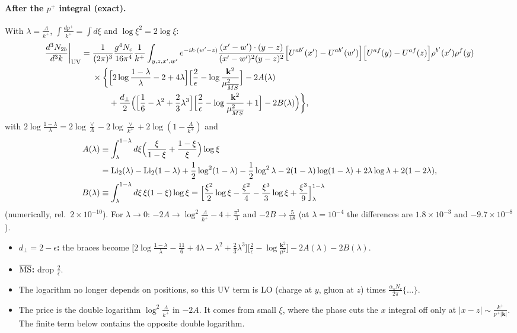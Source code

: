 \documentclass[10pt]{article}
\numberwithin{equation}{section}
\begin{document}
\paragraph{After the $p^+$ integral (exact).} With $\lambda=\frac{\Lambda}{k^+}$, $\int\frac{dp^+}{k^+}=\int d\xi$ and $\log\xi^2=2\log\xi$:
\begin{align}
\frac{d^{3}N_{2b}}{d^{3}k}\bigg|_{\rm UV}={}&\frac{1}{(2\pi)^{3}}\frac{g^{4}N_{c}}{16\pi^{4}}\frac{1}{k^{+}}\int_{y,z,x',w'}e^{-ik\cdot(w'-z)}\frac{(x'-w')\cdot(y-z)}{(x'-w')^{2}(y-z)^{2}}\Big[U^{ab'}(x')-U^{ab'}(w')\Big]\Big[U^{af}(y)-U^{af}(z)\Big]\rho^{b'}(x')\rho^{f}(y)\notag\\
&\times\bigg\{\Big[2\log\frac{1-\lambda}{\lambda}-2+4\lambda\Big]\Big[\frac2\epsilon-\log\frac{\mathbf k^2}{\mu^2_{\overline{MS}}}\Big]-2A(\lambda)\notag\\
&\qquad+\frac{d_\perp}{2}\Big(\Big[\frac16-\lambda^2+\frac23\lambda^3\Big]\Big[\frac2\epsilon-\log\frac{\mathbf k^2}{\mu^2_{\overline{MS}}}+1\Big]-2B(\lambda)\Big)\bigg\},
\label{eq:UV}
\end{align}
with $2\log\frac{1-\lambda}{\lambda}=2\log\frac{\vee}{\Lambda}-2\log\frac{\vee}{k^+}+2\log(1-\frac{\Lambda}{k^+})$ and
\begin{align}
A(\lambda)&\equiv\int_\lambda^{1-\lambda}d\xi\Big(\frac{\xi}{1-\xi}+\frac{1-\xi}{\xi}\Big)\log\xi\notag\\
&=\mathrm{Li}_2(\lambda)-\mathrm{Li}_2(1-\lambda)+\frac12\log^2(1-\lambda)-\frac12\log^2\lambda-2(1-\lambda)\log(1-\lambda)+2\lambda\log\lambda+2(1-2\lambda),\notag\\
B(\lambda)&\equiv\int_\lambda^{1-\lambda}d\xi\,\xi(1-\xi)\log\xi=\Big[\frac{\xi^2}{2}\log\xi-\frac{\xi^2}{4}-\frac{\xi^3}{3}\log\xi+\frac{\xi^3}{9}\Big]_{\lambda}^{1-\lambda}
\end{align}
(numerically, rel.\ $2\times10^{-10}$). For $\lambda\to0$: $-2A\to\log^2\frac{\Lambda}{k^+}-4+\frac{\pi^2}{3}$ and $-2B\to\frac{5}{18}$ (at $\lambda=10^{-4}$ the differences are $1.8\times10^{-3}$ and $-9.7\times10^{-8}$).
\begin{itemize}
\item \textbf{$d_\perp=2-\epsilon$:} the braces become $\big[2\log\frac{1-\lambda}{\lambda}-\frac{11}{6}+4\lambda-\lambda^2+\frac23\lambda^3\big]\big[\frac2\epsilon-\log\frac{\mathbf k^2}{\mu^2}\big]-2A(\lambda)-2B(\lambda)$.
\item \textbf{$\overline{\rm MS}$:} drop $\frac{2}{\epsilon}$.
\item The logarithm no longer depends on positions, so this UV term is LO (charge at $y$, gluon at $z$) times $\frac{\alpha_sN_c}{2\pi}\{\dots\}$.
\item The price is the double logarithm $\log^2\frac{\Lambda}{k^+}$ in $-2A$. It comes from small $\xi$, where the phase cuts the $x$ integral off only at $|x-z|\sim\frac{k^+}{p^+|\mathbf k|}$. The finite term below contains the opposite double logarithm.
\end{itemize}
\end{document}
